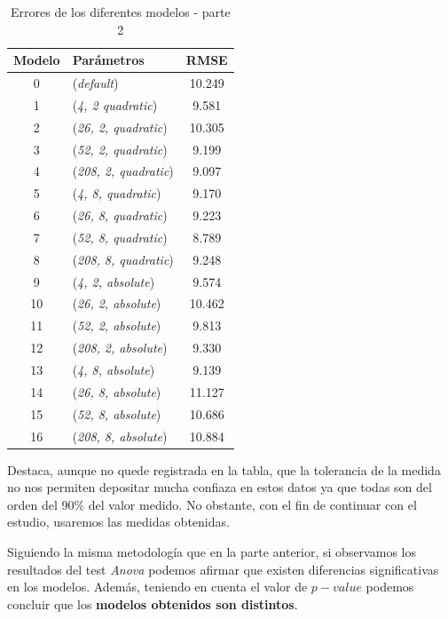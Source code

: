 \documentclass[12pt]{report} %
\begin{document}
\begin{table}[H]
\begin{center}
\begin{tabular}{ |c|l|c| }
    \hline
    Modelo & Parámetros & RMSE\\
    \hline
    \hline
    0 & (\textit{default})              & 10.249\\
    1 & (\textit{4, 2     quadratic})   & 9.581\\
    2 & (\textit{26, 2,   quadratic})   & 10.305\\
    3 & (\textit{52, 2,   quadratic})   & 9.199\\
    4 & (\textit{208, 2,  quadratic})   & 9.097\\
    5 & (\textit{4, 8,    quadratic})   & 9.170\\
    6 & (\textit{26, 8,   quadratic})   & 9.223\\
    7 & (\textit{52, 8,   quadratic})   & 8.789\\
    8 & (\textit{208, 8,  quadratic})   & 9.248\\
    9 & (\textit{4, 2,     absolute})   & 9.574\\
    10 & (\textit{26, 2,   absolute})   & 10.462\\
    11 & (\textit{52, 2,   absolute})   & 9.813\\
    12 & (\textit{208, 2,  absolute})   & 9.330\\
    13 & (\textit{4, 8,    absolute})   & 9.139\\
    14 & (\textit{26, 8,   absolute})   & 11.127\\
    15 & (\textit{52, 8,   absolute})   & 10.686\\
    16 & (\textit{208, 8,  absolute})   & 10.884\\
    \hline
\end{tabular}
\caption{Errores de los diferentes modelos - parte 2}
\end{center}
\end{table}

Destaca, aunque no quede registrada en la tabla, que la tolerancia de la medida no nos permiten depositar mucha confiaza en estos datos ya que todas son del orden del 90\% del valor medido. No obstante, con el fin de continuar con el estudio, usaremos las medidas obtenidas.

Siguiendo la misma metodología que en la parte anterior, si observamos los resultados del test \textit{Anova} podemos afirmar que existen diferencias significativas en los modelos. Además, teniendo en cuenta el valor  de $p-value$ podemos concluir que los \textbf{modelos obtenidos son distintos}.
\end{document}
